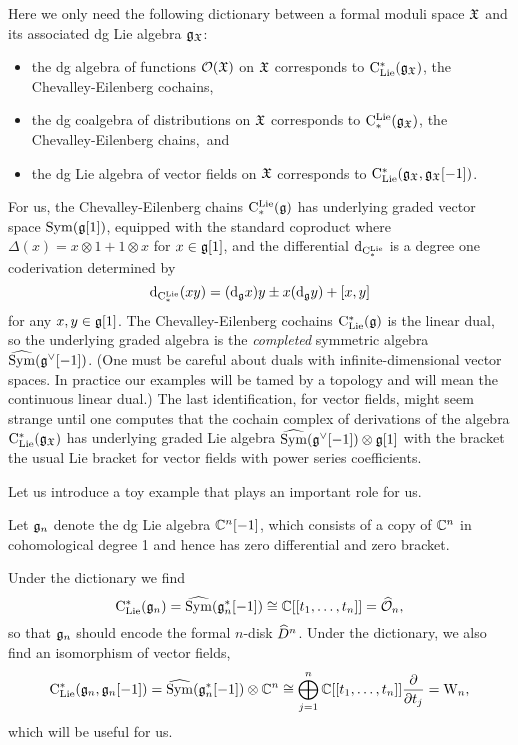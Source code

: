Here we only need the following dictionary between a formal moduli space $\frak{X}$ and its associated dg Lie algebra $\mathfrak g_{\frak{X}}$:
\begin{itemize}
\item the dg algebra of functions $\mathcal O(\frak{X})$ on $\frak{X}$ corresponds to ${\rm C}_{\rm Lie}^*(\mathfrak g_{\frak{X}})$, the Chevalley-Eilenberg cochains,
\item the dg coalgebra of distributions on $\frak{X}$ corresponds to ${\rm C}^{{\rm Lie}}_*(\mathfrak g_{\frak{X}})$, the Chevalley-Eilenberg chains,~and
\item the dg Lie algebra of vector fields on $\frak{X}$ corresponds to ${\rm C}_{\rm Lie}^*(\mathfrak g_{\frak{X}},\mathfrak g_{\frak{X}}[-1])$.
\end{itemize}
For us, the Chevalley-Eilenberg chains ${\rm C}^{\rm Lie}_*(\mathfrak g)$ has underlying graded vector space ${\rm Sym}(\mathfrak g[1])$,
equipped with the standard coproduct where $\Delta(x) = x \otimes 1 + 1 \otimes x$ for $x \in \mathfrak g[1]$, 
and the differential ${\rm d}_{{\rm C}^{\rm Lie}_*}$ is a degree one coderivation determined by  
\[
{\rm d}_{{\rm C}^{\rm Lie}_*}(xy) = ({\rm d}_\mathfrak g x) y \pm x({\rm d}_\mathfrak g y) + [x,y]
\]
for any $x,y \in \mathfrak g[1]$.
The Chevalley-Eilenberg cochains ${\rm C}_{\rm Lie}^*(\mathfrak g)$ is the linear dual, so the underlying graded algebra is the {\em completed}
symmetric algebra $\widehat{{\rm Sym}}(\mathfrak g^\vee[-1])$.
(One must be careful about duals with infinite-dimensional vector spaces. 
In practice our examples will be tamed by a topology and will mean the continuous linear dual.)
The last identification, for vector fields, might seem strange until one computes that 
the cochain complex of derivations of the algebra ${\rm C}_{\rm Lie}^*(\mathfrak g_{\frak{X}})$ has underlying graded Lie algebra 
$\widehat{{\rm Sym}}(\mathfrak g^\vee[-1]) \otimes \mathfrak g[1]$ with the bracket the usual Lie bracket for vector fields with power series coefficients.

Let us introduce a toy example that plays an important role for us. 

\begin{dfn}\label{dfn fgn}
Let $\mathfrak{g}_n$ denote the dg Lie algebra $\mathbb C^n[-1]$,
which consists of a copy of $\mathbb C^n$ in cohomological degree 1
and hence has zero differential and zero bracket.
\end{dfn}

Under the dictionary we find
$${\rm C}_{\rm Lie}^*(\mathfrak g_n) = \widehat{{\rm Sym}}(\mathfrak g_n^*[-1]) \cong \mathbb C[[t_1,\ldots,t_n]] = \widehat{\mathcal O}_n,$$
so that $\mathfrak g_n$ should encode the formal $n$-disk $\widehat{D}^n$.
Under the dictionary, we also find an isomorphism of vector fields,
$${\rm C}_{\rm Lie}^*(\mathfrak g_n,\mathfrak g_n[-1]) = \widehat{{\rm Sym}}(\mathfrak g_n^*[-1]) \otimes \mathbb C^n \cong \bigoplus_{j=1}^n \mathbb C[[t_1,\ldots,t_n]] \frac{\partial}{\partial t_j} = {{\rm W}_n},$$
which will be useful for us.

